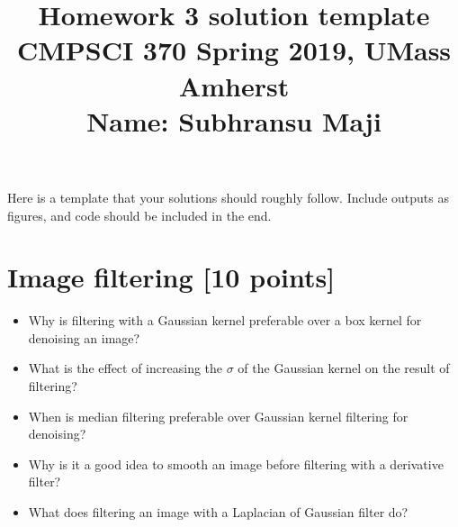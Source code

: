 \documentclass[10pt,letterpaper]{article}
\title{
  Homework 3 solution template\\
  \Large{CMPSCI 370 Spring 2019, UMass Amherst} \\
  \Large{Name: Subhransu Maji} \\
}
\date{}
\begin{document}
\maketitle

\renewcommand\thesubsection{\thesection.\alph{subsection}}

Here is a template that your solutions should roughly follow. Include outputs as figures, and code should be included in the end.


\section{Image filtering [10 points]}
\begin{itemize}
\item Why is filtering with a Gaussian kernel preferable over a box kernel for denoising an image?
\vspace{1.in}

\item What is the effect of increasing the $\sigma$ of the Gaussian kernel on the result of filtering?
\vspace{1.in}

\item When is median filtering preferable over Gaussian kernel filtering for denoising?
\vspace{1.in}

\item Why is it a good idea to smooth an image before filtering with a derivative filter?
\vspace{1.in}
\item What does filtering an image with a Laplacian of Gaussian filter do?
\vspace{1.in}
\end{itemize}
\end{document}
